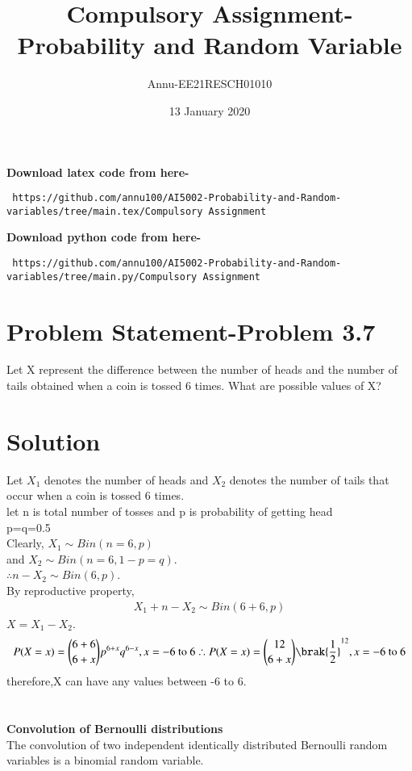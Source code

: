 \documentclass[journel,12pt,twocoloums]{IEEEtran}
\title{Compulsory Assignment-Probability and Random Variable}
\author{Annu-EE21RESCH01010}
\date{13 January 2020}
\begin{document}
 \maketitle
\textbf{Download latex code from here-}\\
\begin{lstlisting}
 https://github.com/annu100/AI5002-Probability-and-Random-variables/tree/main.tex/Compulsory Assignment
 \end{lstlisting}
 \textbf{Download python code from here-}\\
\begin{lstlisting}
 https://github.com/annu100/AI5002-Probability-and-Random-variables/tree/main.py/Compulsory Assignment
 \end{lstlisting}
 \section{Problem Statement-Problem 3.7}


Let X represent the difference between the
number of heads and the number of tails
obtained when a coin is tossed 6 times. What
are possible values of X?
\section{Solution}
Let $X_1$ denotes the number of heads and $X_2$ denotes the number of tails that occur when a coin is tossed 6 times.\\

let n is total number of tosses and p is probability of getting head \\
p=q=0.5\\
Clearly, $X_1 \sim Bin(n=6,p)$\\
and $X_2 \sim Bin(n=6,1-p=q)$.\\
$\therefore n-X_2 \sim Bin(6, p)$.\\
By reproductive property,
\begin{align}
    X_1+n-X_2 \sim Bin(6+6, p)
\end{align}
$X=X_1-X_2$. 
\begin{align}
    P(X=x) = \binom{6+6}{6+x} p^{6+x} q^{6-x}, x= -6\ \text{to}\ 6 

    \therefore P(X=x) = \binom{12}{6+x}\brak{\frac{1}{2}}^{12},x= -6\ \text{to}\ 6 
\end{align}
 therefore,X can have any values between -6 to 6.\\
 \\
 \\
\textbf{Convolution of Bernoulli distributions}\\
The convolution of two independent identically distributed Bernoulli random variables is a binomial random variable.
\end{document}
